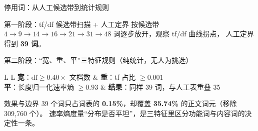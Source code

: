 \documentclass[UTF8,fontset=none,aspectratio=169,10pt]{ctexbeamer}
\newcommand{\key}[1]{\textcolor{accent}{\textbf{#1}}}
\newcommand{\src}[1]{\par\vspace{0.5em}{\fontsize{8}{9.6}\selectfont\color{gray}#1\par}}
\newcommand{\vsp}{\vspace*{\stretch{1}}}
\begin{document}
\begin{frame}{停用词：从人工候选带到统计规则}
  \begin{block}{第一阶段：tf/df 候选带扫描 + 人工定界}
    \normalsize
    按候选带 $4 \to 9 \to 14 \to 16 \to 21 \to 31 \to 48$ 词逐步放开，观察 tf/df 曲线拐点，
    人工定界得到 \key{39 词}。
  \end{block}
  \vsp
  \begin{block}{第二阶段：``宽、重、平''三特征规则（纯统计，无人为挑选）}
    \normalsize
    \begin{tabularx}{\linewidth}{L L}
      \key{宽}：$\mathrm{df} \ge 0.40 \times$ 文档数 &
      \key{重}：tf 占比 $\ge 0.001$ \\
      \key{平}：长度归一化速率熵 $\ge 0.93$ &
      \key{结果}：同样 39 词，与人工表重叠 35 \\
    \end{tabularx}
  \end{block}
  \vsp
  \begin{block}{效果与边界}
    \normalsize
    39 个词只占词表的 \key{0.15\%}，却覆盖 \key{35.74\%} 的正文词元（移除 309,760 个）。
    速率熵度量``分布是否平坦''，是三特征里区分功能词与内容词的决定性一条。
  \end{block}
\end{frame}
\end{document}
